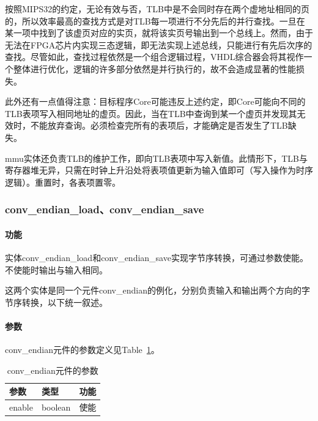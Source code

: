\documentclass{article}
\begin{document}
\begin{spacing}{1.4}
按照MIPS32的约定，无论有效与否，TLB中是不会同时存在两个虚地址相同的页的，所以效率最高的查找方式是对TLB每一项进行不分先后的并行查找。一旦在某一项中找到了该虚页对应的实页，就将该实页号输出到一个总线上。然而，由于无法在FPGA芯片内实现三态逻辑，即无法实现上述总线，只能进行有先后次序的查找。尽管如此，查找过程依然是一个组合逻辑过程，VHDL综合器会将其视作一个整体进行优化，逻辑的许多部分依然是并行执行的，故不会造成显著的性能损失。

此外还有一点值得注意：目标程序\textmu Core可能违反上述约定，即\textmu Core可能向不同的TLB表项写入相同地址的虚页。因此，当在TLB中查询到某一个虚页并发现其无效时，不能放弃查询。必须检查完所有的表项后，才能确定是否发生了TLB缺失。

mmu实体还负责TLB的维护工作，即向TLB表项中写入新值。此情形下，TLB与寄存器堆无异，只需在时钟上升沿处将表项值更新为输入值即可（写入操作为时序逻辑）。重置时，各表项置零。

\subsubsection{conv\_endian\_load、conv\_endian\_save}

\paragraph{功能}\mbox{}

实体conv\_endian\_load和conv\_endian\_save实现字节序转换，可通过参数使能。不使能时输出与输入相同。

这两个实体是同一个元件conv\_endian的例化，分别负责输入和输出两个方向的字节序转换，以下统一叙述。

\paragraph{参数}\mbox{}

conv\_endian元件的参数定义见Table~\ref{tb:convendian-parameter}。
\begin{table}[!htb]
\begin{center}
\begin{tabular*}{15cm}{l|l|l}
\hline
\textbf{参数}&\textbf{类型}&\textbf{功能} \\
\hline enable        & boolean    & 使能 \\
\hline
\end{tabular*}
\caption{conv\_endian元件的参数}
\label{tb:convendian-parameter}
\end{center}
\end{table}


\end{spacing}
\end{document}
